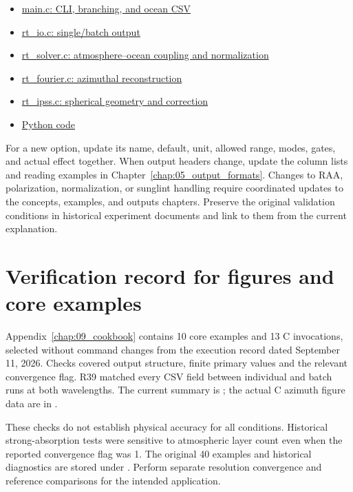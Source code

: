 \begin{itemize}
\item \href{https://github.com/brtnt/OCRT/blob/54861c68e35ec5aaa3938fad53e93dc2dfa7eb1d/code/OCRT_C/src/main.c}{main.c: CLI, branching, and ocean CSV}
\item \href{https://github.com/brtnt/OCRT/blob/54861c68e35ec5aaa3938fad53e93dc2dfa7eb1d/code/OCRT_C/src/rt_io.c}{rt\_io.c: single/batch output}
\item \href{https://github.com/brtnt/OCRT/blob/54861c68e35ec5aaa3938fad53e93dc2dfa7eb1d/code/OCRT_C/src/rt_solver.c}{rt\_solver.c: atmosphere--ocean coupling and normalization}
\item \href{https://github.com/brtnt/OCRT/blob/54861c68e35ec5aaa3938fad53e93dc2dfa7eb1d/code/OCRT_C/src/rt_fourier.c}{rt\_fourier.c: azimuthal reconstruction}
\item \href{https://github.com/brtnt/OCRT/blob/54861c68e35ec5aaa3938fad53e93dc2dfa7eb1d/code/OCRT_C/src/rt_ipss.c}{rt\_ipss.c: spherical geometry and correction}
\item \href{https://github.com/brtnt/OCRT/tree/54861c68e35ec5aaa3938fad53e93dc2dfa7eb1d/code/OCRT_Python}{Python code}
\end{itemize}

For a new option, update its name, default, unit, allowed range, modes, gates, and actual effect together. When output headers change, update the column lists and reading examples in Chapter~\ref{chap:05_output_formats}. Changes to RAA, polarization, normalization, or sunglint handling require coordinated updates to the concepts, examples, and outputs chapters. Preserve the original validation conditions in historical experiment documents and link to them from the current explanation.

\section{Verification record for figures and core examples}
\label{sec:auto:07_validation_notes:6}
Appendix~\ref{chap:09_cookbook} contains 10 core examples and 13 C invocations, selected without command changes from the execution record dated September 11, 2026. Checks covered output structure, finite primary values and the relevant convergence flag. R39 matched every CSV field between individual and batch runs at both wavelengths. The current summary is ; the actual C azimuth figure data are in .

These checks do not establish physical accuracy for all conditions. Historical strong-absorption tests were sensitive to atmospheric layer count even when the reported convergence flag was 1. The original 40 examples and historical diagnostics are stored under . Perform separate resolution convergence and reference comparisons for the intended application.
